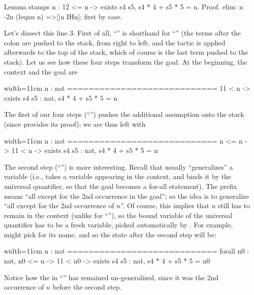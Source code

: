 \begin{coq}{}{}
Lemma stamps n : 12 <= n -> exists s4 s5, s4 * 4 + s5 * 5 = n.
Proof.
elim: n {-2}n (leqnn n) =>[|n IHn]; first by case.
\end{coq}

Let's dissect this line 3. First of all,
``'' is shorthand for
``'' (the terms after the
colon \C{:} are pushed to the stack, from right to left; and the
 tactic is applied afterwards to the top of the stack, which
of course is the last term pushed to the stack). Let us see how these
four steps transform the goal. At the beginning, the context and the
goal are

\begin{coqout}{}{width=11cm}
  n : nat
  ============================
  11 < n -> exists s4 s5 : nat, s4 * 4 + s5 * 5 = n
\end{coqout}

The first of our
four steps (``'') pushes the additional
assumption  onto the stack (since  provides
its proof); we are thus left with

\begin{coqout}{}{width=11cm}
  n : nat
  ============================
  n <= n -> 11 < n -> exists s4 s5 : nat, s4 * 4 + s5 * 5 = n
\end{coqout}

The second step (``'') is more interesting. Recall
that  usually ``generalizes'' a variable (i.e., takes a
variable appearing in the context, and binds it by the universal
quantifier, so that the goal becomes a for-all statement). The prefix
 means ``all except for the 2nd occurrence in the goal''; so
the idea is
to generalize ``all except for the 2nd occurrence of $n$''. Of course,
this implies that $n$ still has to remain in the context (unlike for
``''), so the
bound variable of the universal quantifier has to be a fresh
variable, picked automatically by \Coq{}. For example, \Coq{} might
pick  for its name, and so the state after the second step will
be:

\begin{coqout}{}{width=11cm}
  n : nat
  ============================
  forall n0 : nat,
  n0 <= n -> 11 < n0 -> exists s4 s5 : nat, s4 * 4 + s5 * 5 = n0
\end{coqout}

Notice how the  in ``'' has remained un-generalized,
since it was the 2nd occurrence of $n$ before the second step.

